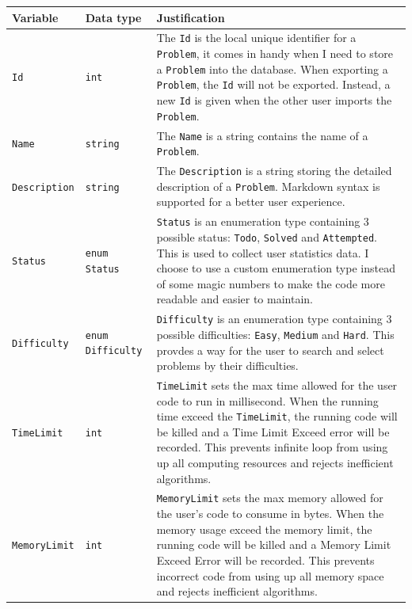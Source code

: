 \documentclass[a4paper]{report}
\begin{document}
\begin{tabulary}{\textwidth}{|l|l|L|}
    \hline
    Variable & Data type & Justification \\
    \hline
    \texttt{Id} & \texttt{int} & The \texttt{Id} is the local unique identifier for a \texttt{Problem}, it comes in handy when I need to store a \texttt{Problem} into the database. When exporting a \texttt{Problem}, the \texttt{Id} will not be exported. Instead, a new \texttt{Id} is given when the other user imports the \texttt{Problem}. \\
    \hline
    \texttt{Name} & \texttt{string} & The \texttt{Name} is a string contains the name of a \texttt{Problem}. \\
    \hline
    \texttt{Description} & \texttt{string} & The \texttt{Description} is a string storing the detailed description of a \texttt{Problem}. Markdown syntax is supported for a better user experience. \\
    \hline
    \texttt{Status} & \texttt{enum Status} & \texttt{Status} is an enumeration type containing 3 possible status: \texttt{Todo}, \texttt{Solved} and \texttt{Attempted}. This is used to collect user statistics data. I choose to use a custom enumeration type instead of some magic numbers to make the code more readable and easier to maintain. \\
    \hline
    \texttt{Difficulty} & \texttt{enum Difficulty} & \texttt{Difficulty} is an enumeration type containing 3 possible difficulties: \texttt{Easy}, \texttt{Medium} and \texttt{Hard}. This provdes a way for the user to search and select problems by their difficulties. \\
    \hline
    \texttt{TimeLimit} & \texttt{int} & \texttt{TimeLimit} sets the max time allowed for the user code to run in millisecond. When the running time exceed the \texttt{TimeLimit}, the running code will be killed and a Time Limit Exceed error will be recorded. This prevents infinite loop from using up all computing resources and rejects inefficient algorithms. \\
    \hline
    \texttt{MemoryLimit} & \texttt{int} & \texttt{MemoryLimit} sets the max memory allowed for the user's code to consume in bytes. When the memory usage exceed the memory limit, the running code will be killed and a Memory Limit Exceed Error will be recorded. This prevents incorrect code from using up all memory space and rejects inefficient algorithms. \\
    \hline
\end{tabulary}
\end{document}
